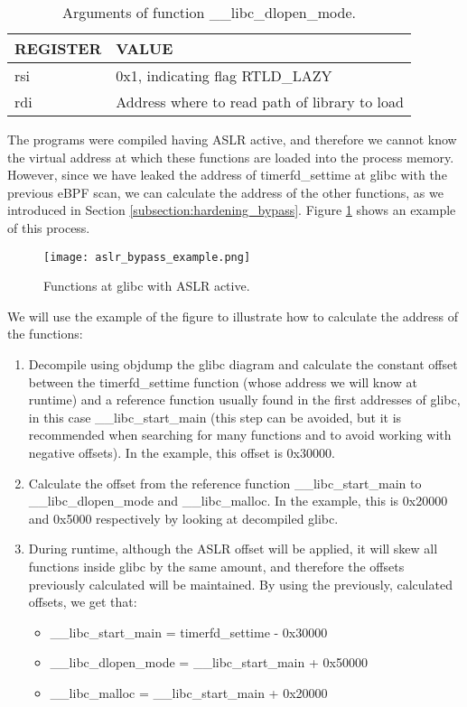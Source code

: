 \begin{table}[htbp]
\begin{tabular}{|>{\centering\arraybackslash}p{3cm}|>{\centering\arraybackslash}p{10cm}|}
\hline
\textbf{REGISTER} & \textbf{VALUE}\\
\hline
\hline
rsi & 0x1, indicating flag RTLD\_LAZY\\
\hline
rdi & Address where to read path of library to load\\
\hline
\end{tabular}
\caption{Arguments of function \_\_libc\_dlopen\_mode.}
\label{table:libc_dlopen_mode}
\end{table}

The programs were compiled having ASLR active, and therefore we cannot know the virtual address at which these functions are loaded into the process memory. However, since we have leaked the address of timerfd\_settime at glibc with the previous eBPF scan, we can calculate the address of the other functions, as we introduced in Section \ref{subsection:hardening_bypass}. Figure \ref{fig:aslr_bypass_example} shows an example of this process.

\begin{figure}[htbp]
	\centering
	\texttt{[image: aslr\_bypass\_example.png]}
	\caption{Functions at glibc with ASLR active.}
	\label{fig:aslr_bypass_example}
\end{figure}

We will use the example of the figure to illustrate how to calculate the address of the functions:
\begin{enumerate}
\item Decompile using objdump the glibc diagram and calculate the constant offset between the timerfd\_settime function (whose address we will know at runtime) and a reference function usually found in the first addresses of glibc, in this case \_\_libc\_start\_main (this step can be avoided, but it is recommended when searching for many functions and to avoid working with negative offsets). In the example, this offset is 0x30000.
\item Calculate the offset from the reference function \_\_libc\_start\_main to \_\_libc\_dlopen\_mode and \_\_libc\_malloc. In the example, this is 0x20000 and 0x5000 respectively by looking at  decompiled glibc.
\item During runtime, although the ASLR offset will be applied, it will skew all functions inside glibc by the same amount, and therefore the offsets previously calculated will be maintained. By using the previously, calculated offsets, we get that:
\begin{itemize}
	\item \_\_libc\_start\_main = timerfd\_settime - 0x30000
	\item \_\_libc\_dlopen\_mode = \_\_libc\_start\_main + 0x50000
	\item \_\_libc\_malloc = \_\_libc\_start\_main + 0x20000
\end{itemize}
\end{enumerate}

